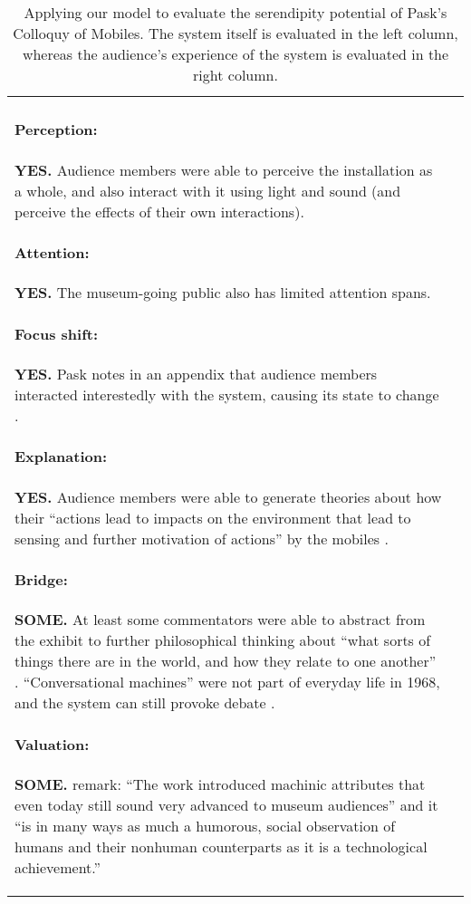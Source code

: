 \begin{table}
\begin{mdframed}
\begin{tabular}{@{\hspace{-0.01\textwidth}}p{}@{\hspace{.02\textwidth}}p{}}
\begin{minipage}{.48\textwidth}
\paragraph{Perception:} \textbf{YES.}
Audience members were able to perceive the installation as a whole,
and also interact with it using light and sound (and perceive the
effects of their own interactions). 
\paragraph{Attention:} \textbf{YES.}
The museum-going public also has limited attention spans.
\paragraph{Focus shift:} \textbf{YES.}
Pask notes in an appendix 
that audience members interacted interestedly with the system, causing its state to change \cite[p.~98]{pask1971comment}.
\paragraph{Explanation:} \textbf{YES.}
Audience members were able to generate theories about how
their ``actions lead to impacts on the environment that lead to
sensing and further motivation of actions'' by the mobiles
\cite{haque2007architectural}.
\paragraph{Bridge:} \textbf{SOME.} 
At least some commentators were able to abstract from the exhibit to further philosophical thinking
about ``what sorts of things there are in the world, and how they
relate to one another'' \cite{pickering2007ontological}.
``Conversational machines'' were not part of everyday life in 1968,
and the system can still provoke debate \cite{pangaro2018serendipity}.
\paragraph{Valuation:} \textbf{SOME.}
\citet[p.~5]{gemeinboeck2015performance} remark: ``The work introduced machinic attributes that even
today still sound very advanced to museum audiences'' and it ``is
in many ways as much a humorous, social observation of humans and
their nonhuman counterparts as it is a technological achievement.''
\end{minipage}
\end{tabular}
\end{mdframed}
\caption{Applying our model to evaluate the serendipity potential of Pask's {\sf Colloquy of Mobiles}.  The system itself is evaluated in the left column, whereas the audience's experience of the system is evaluated in the right column. \label{ex:mobiles}}
\end{table}



